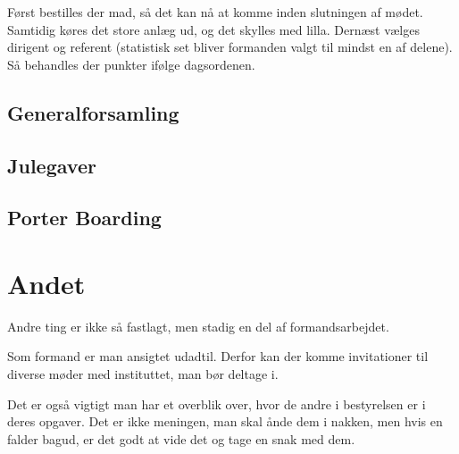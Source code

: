 Først bestilles der mad, så det kan nå at komme inden slutningen af
mødet. Samtidig køres det store anlæg ud, og det skylles med
lilla. Dernæst vælges dirigent og referent (statistisk set bliver
formanden valgt til mindst en af delene). Så behandles der punkter
ifølge dagsordenen.

\subsection{Generalforsamling}
\label{sec:generalforsamling}


\subsection{Julegaver}
\label{sec:julegaver}


\subsection{Porter Boarding}
\label{sec:porter-boarding}


\section{Andet}
\label{sec:andet}

Andre ting er ikke så fastlagt, men stadig en del af formandsarbejdet.

Som formand er man ansigtet udadtil. Derfor kan der komme invitationer
til diverse møder med instituttet, man bør deltage i.

Det er også vigtigt man har et overblik over, hvor de andre i
bestyrelsen er i deres opgaver. Det er ikke meningen, man skal ånde
dem i nakken, men hvis en falder bagud, er det godt at vide det og
tage en snak med dem.



